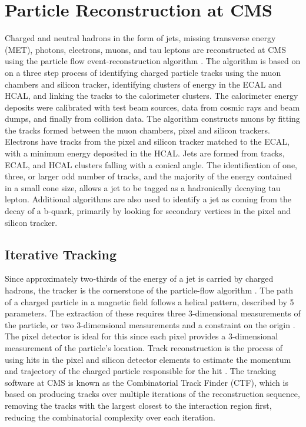 \chapter{Particle Reconstruction at CMS}
\label{reconstruction_overview}

\par Charged and neutral hadrons in the form of jets, missing
transverse energy (MET), photons, electrons, muons, and tau leptons
are reconstructed at CMS using the particle flow event-reconstruction
algorithm \cite{CMS-PAS-PFT-09-001}.  The algorithm is based on on a
three step process of identifying charged particle tracks using the
muon chambers and silicon tracker, identifying clusters of energy in
the ECAL and HCAL, and linking the tracks to the calorimeter
clusters.  The calorimeter energy deposits were calibrated with test
beam sources, data from cosmic rays and beam dumps, and finally from
collision data.  The algorithm constructs muons by fitting the tracks
formed between the muon chambers, pixel and silicon trackers.
Electrons have tracks from the pixel and silicon tracker matched to
the ECAL, with a minimum energy deposited in the HCAL.  Jets are
formed from tracks, ECAL, and HCAL clusters falling with a conical
angle.  The identification of one, three, or larger odd number of
tracks, and the majority of the energy contained in a small cone size,
allows a jet to be tagged as a hadronically decaying tau lepton.
Additional algorithms are also used to identify a jet as coming from
the decay of a b-quark, primarily by looking for secondary vertices in
the pixel and silicon tracker.  


\section{Iterative Tracking}
\label{iterative_tracking_overview}

\par Since approximately two-thirds of the energy of a jet is carried by
charged hadrons, the tracker is the cornerstone of the particle-flow
algorithm \cite{CMS-PAS-PFT-09-001}.  The path of a charged particle in
a magnetic field follows a helical pattern, described by 5 parameters.
The extraction of these requires three 3-dimensional measurements of
the particle, or two 3-dimensional measurements and a constraint on
the origin \cite{Chatrchyan:2014fea}.  The pixel detector is ideal for
this since each pixel provides a 3-dimensional measurement of the
particle's location.  Track reconstruction is the process of using
hits in the pixel and silicon detector elements to estimate the
momentum and trajectory of the charged particle  responsible for the
hit \cite{Chatrchyan:2014fea}.  The tracking software at CMS is known
as the Combinatorial Track Finder (CTF), which is based on producing
tracks over multiple iterations of the reconstruction sequence,
removing the tracks with the largest \PT closest to the interaction
region first, reducing the combinatorial complexity over each
iteration.   

